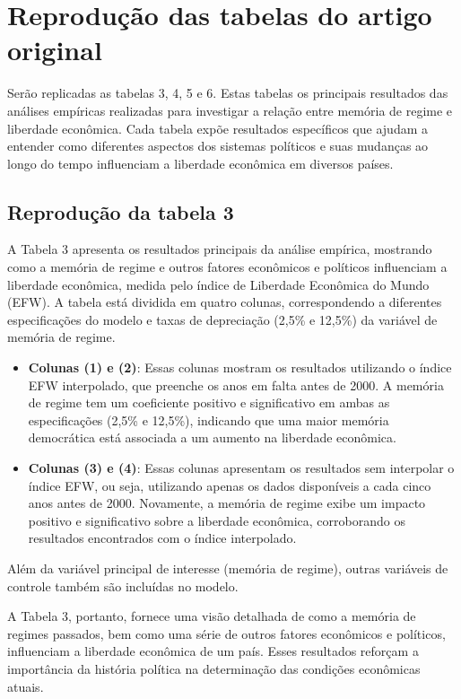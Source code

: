 \section{Reprodução das tabelas do artigo original}

Serão replicadas as tabelas 3, 4, 5 e 6. Estas tabelas os principais resultados das análises empíricas realizadas para investigar a relação entre memória de regime e liberdade econômica. Cada tabela expõe resultados específicos que ajudam a entender como diferentes aspectos dos sistemas políticos e suas mudanças ao longo do tempo influenciam a liberdade econômica em diversos países.

\subsection{Reprodução da tabela 3}

A Tabela 3 apresenta os resultados principais da análise empírica, mostrando como a memória de regime e outros fatores econômicos e políticos influenciam a liberdade econômica, medida pelo índice de Liberdade Econômica do Mundo (EFW). A tabela está dividida em quatro colunas, correspondendo a diferentes especificações do modelo e taxas de depreciação (2,5\% e 12,5\%) da variável de memória de regime.

\begin{itemize}
    \item \textbf{Colunas (1) e (2)}: Essas colunas mostram os resultados utilizando o índice EFW interpolado, que preenche os anos em falta antes de 2000. A memória de regime tem um coeficiente positivo e significativo em ambas as especificações (2,5\% e 12,5\%), indicando que uma maior memória democrática está associada a um aumento na liberdade econômica.
    \item \textbf{Colunas (3) e (4)}: Essas colunas apresentam os resultados sem interpolar o índice EFW, ou seja, utilizando apenas os dados disponíveis a cada cinco anos antes de 2000. Novamente, a memória de regime exibe um impacto positivo e significativo sobre a liberdade econômica, corroborando os resultados encontrados com o índice interpolado.
\end{itemize}

Além da variável principal de interesse (memória de regime), outras variáveis de controle também são incluídas no modelo.

A Tabela 3, portanto, fornece uma visão detalhada de como a memória de regimes passados, bem como uma série de outros fatores econômicos e políticos, influenciam a liberdade econômica de um país. Esses resultados reforçam a importância da história política na determinação das condições econômicas atuais.

